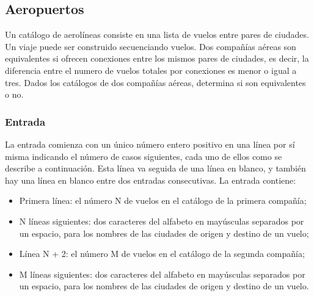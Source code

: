 \newpage
\subsection*{Aeropuertos}

Un catálogo de aerolíneas consiste en una lista de vuelos entre pares de ciudades. Un
viaje puede ser construido secuenciando vuelos. Dos compañías aéreas son equivalentes si
ofrecen conexiones entre los mismos pares de ciudades, es decir, la diferencia entre el
numero de vuelos totales por conexiones es menor o igual a tres. Dados los catálogos de
dos compañías aéreas, determina si son equivalentes o no.

\subsubsection*{Entrada}
La entrada comienza con un único número entero positivo en una línea por sí misma
indicando el número de casos siguientes, cada uno de ellos como se describe a
continuación. Esta línea va seguida de una línea en blanco, y también hay una línea en
blanco entre dos entradas consecutivas. La entrada contiene:
\begin{itemize}
    \item Primera línea: el número N de vuelos en el catálogo de la primera compañía;

    \item N líneas siguientes: dos caracteres del alfabeto en mayúsculas separados por un
    espacio, para los nombres de las ciudades de origen y destino de un vuelo;

    \item Línea N + 2: el número M de vuelos en el catálogo de la segunda compañía;

    \item M líneas siguientes: dos caracteres del alfabeto en mayúsculas separados por un
    espacio, para los nombres de las ciudades de origen y destino de un vuelo.
\end{itemize}


